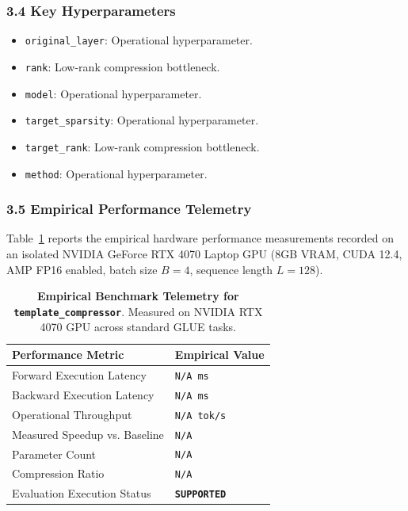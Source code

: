 \subsubsection*{3.4 Key Hyperparameters}
\begin{itemize}
    \item \texttt{original\_layer}: Operational hyperparameter.
    \item \texttt{rank}: Low-rank compression bottleneck.
    \item \texttt{model}: Operational hyperparameter.
    \item \texttt{target\_sparsity}: Operational hyperparameter.
    \item \texttt{target\_rank}: Low-rank compression bottleneck.
    \item \texttt{method}: Operational hyperparameter.
\end{itemize}

\subsubsection*{3.5 Empirical Performance Telemetry}
Table~\ref{tab:telemetry_template\_compressor} reports the empirical hardware performance measurements recorded on an isolated NVIDIA GeForce RTX 4070 Laptop GPU (8GB VRAM, CUDA 12.4, AMP FP16 enabled, batch size $B=4$, sequence length $L=128$).

\begin{table}[h]
\centering
\small
\caption{\textbf{Empirical Benchmark Telemetry for \texttt{template\_compressor}}. Measured on NVIDIA RTX 4070 GPU across standard GLUE tasks.}
\label{tab:telemetry_template\_compressor}
\begin{tabularx}{\columnwidth}{lX}
\toprule
\textbf{Performance Metric} & \textbf{Empirical Value} \\
\midrule
Forward Execution Latency & \texttt{N/A ms} \\
Backward Execution Latency & \texttt{N/A ms} \\
Operational Throughput & \texttt{N/A tok/s} \\
Measured Speedup vs. Baseline & \texttt{N/A} \\
Parameter Count & \texttt{N/A} \\
Compression Ratio & \texttt{N/A} \\
Evaluation Execution Status & \textbf{\texttt{SUPPORTED}} \\
\bottomrule
\end{tabularx}
\end{table}

